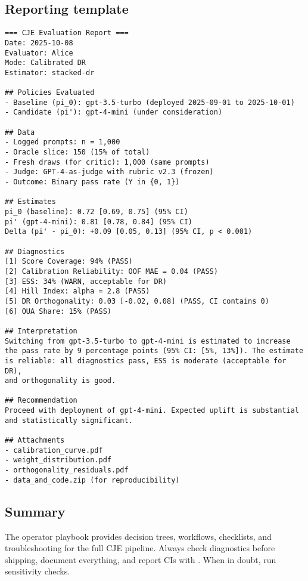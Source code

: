 \subsection{Reporting template}

\begin{lstlisting}
=== CJE Evaluation Report ===
Date: 2025-10-08
Evaluator: Alice
Mode: Calibrated DR
Estimator: stacked-dr

## Policies Evaluated
- Baseline (pi_0): gpt-3.5-turbo (deployed 2025-09-01 to 2025-10-01)
- Candidate (pi'): gpt-4-mini (under consideration)

## Data
- Logged prompts: n = 1,000
- Oracle slice: 150 (15% of total)
- Fresh draws (for critic): 1,000 (same prompts)
- Judge: GPT-4-as-judge with rubric v2.3 (frozen)
- Outcome: Binary pass rate (Y in {0, 1})

## Estimates
pi_0 (baseline): 0.72 [0.69, 0.75] (95% CI)
pi' (gpt-4-mini): 0.81 [0.78, 0.84] (95% CI)
Delta (pi' - pi_0): +0.09 [0.05, 0.13] (95% CI, p < 0.001)

## Diagnostics
[1] Score Coverage: 94% (PASS)
[2] Calibration Reliability: OOF MAE = 0.04 (PASS)
[3] ESS: 34% (WARN, acceptable for DR)
[4] Hill Index: alpha = 2.8 (PASS)
[5] DR Orthogonality: 0.03 [-0.02, 0.08] (PASS, CI contains 0)
[6] OUA Share: 15% (PASS)

## Interpretation
Switching from gpt-3.5-turbo to gpt-4-mini is estimated to increase
the pass rate by 9 percentage points (95% CI: [5%, 13%]). The estimate
is reliable: all diagnostics pass, ESS is moderate (acceptable for DR),
and orthogonality is good.

## Recommendation
Proceed with deployment of gpt-4-mini. Expected uplift is substantial
and statistically significant.

## Attachments
- calibration_curve.pdf
- weight_distribution.pdf
- orthogonality_residuals.pdf
- data_and_code.zip (for reproducibility)
\end{lstlisting}

\subsection{Summary}

The operator playbook provides decision trees, workflows, checklists, and troubleshooting for the full CJE pipeline. Always check diagnostics before shipping, document everything, and report CIs with \oua. When in doubt, run sensitivity checks.
